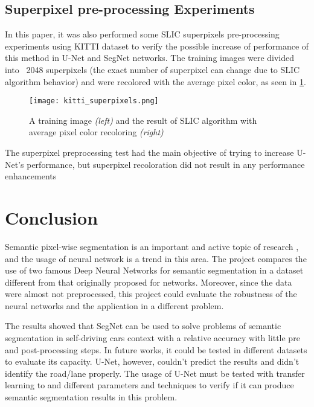 \documentclass[10pt,twocolumn,letterpaper]{article}
\begin{document}
\subsection{Superpixel pre-processing Experiments} \label{ssec:superpixel_experiments}

In this paper, it was also performed some SLIC superpixels pre-processing experiments using KITTI dataset to verify the possible increase of performance of this method in U-Net and SegNet networks. The training images were divided into ~2048 superpixels (the exact number of superpixel can change due to SLIC algorithm behavior) and were recolored with the average pixel color, as seen in \ref{fig:kitt_superpixels}. 

\begin{figure}[ht]
  \centering
  \texttt{[image: kitti\_superpixels.png]}
  \caption{A training image \textit{(left)} and the result of SLIC algorithm with average pixel color recoloring \textit{(right)}}
  \label{fig:kitt_superpixels}
\end{figure} 

The superpixel preprocessing test had the main objective of trying to increase U-Net's performance, but superpixel recoloration did not result in any performance enhancements

\section{Conclusion} \label{sec:conclusion}


Semantic pixel-wise segmentation is an important and active topic of research \cite{SEGNET}, and the usage of neural network is a trend in this area. The project compares the use of two famous Deep Neural Networks for semantic segmentation in a dataset different from that originally proposed for networks. Moreover, since the data were almost not preprocessed, this project could evaluate the robustness of the neural networks and the application in a different problem.

The results showed that SegNet can be used to solve problems of semantic segmentation in self-driving cars context with a relative accuracy with little pre and post-processing steps. In future works, it could be tested in different datasets to evaluate its capacity. U-Net, however, couldn't predict the results and didn't identify the road/lane properly. The usage of U-Net must be tested with transfer learning to and different parameters and techniques to verify if it can produce semantic segmentation results in this problem.
\end{document}
